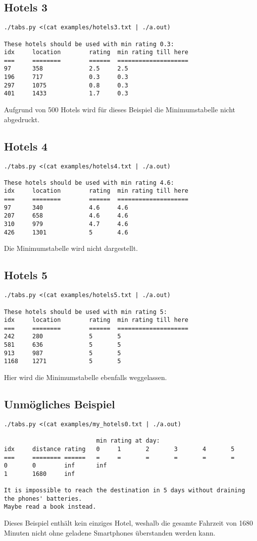 \documentclass[a4paper,10pt,ngerman]{scrartcl}
\begin{document}
\subsection*{Hotels 3}
\begin{lstlisting}
./tabs.py <(cat examples/hotels3.txt | ./a.out)

These hotels should be used with min rating 0.3:
idx     location        rating  min rating till here
===     ========        ======  ====================
97      358             2.5     2.5
196     717             0.3     0.3
297     1075            0.8     0.3
401     1433            1.7     0.3
\end{lstlisting}
Aufgrund von 500 Hotels wird für dieses Beispiel die Minimumstabelle nicht abgedruckt.

\subsection*{Hotels 4}
\begin{lstlisting}
./tabs.py <(cat examples/hotels4.txt | ./a.out)

These hotels should be used with min rating 4.6:
idx     location        rating  min rating till here
===     ========        ======  ====================
97      340             4.6     4.6
207     658             4.6     4.6
310     979             4.7     4.6
426     1301            5       4.6
\end{lstlisting}
Die Minimumstabelle wird nicht dargestellt.

\subsection*{Hotels 5}
\begin{lstlisting}
./tabs.py <(cat examples/hotels5.txt | ./a.out)

These hotels should be used with min rating 5:
idx     location        rating  min rating till here
===     ========        ======  ====================
242     280             5       5
581     636             5       5
913     987             5       5
1168    1271            5       5
\end{lstlisting}
Hier wird die Minimumstabelle ebenfalls weggelassen.

\subsection*{Unmögliches Beispiel}
\begin{lstlisting}
./tabs.py <(cat examples/my_hotels0.txt | ./a.out)

                          min rating at day:
idx     distance rating   0     1       2       3       4       5
===     ======== ======   =     =       =       =       =       =
0       0        inf      inf
1       1680     inf

It is impossible to reach the destination in 5 days without draining the phones' batteries.
Maybe read a book instead.
\end{lstlisting}
Dieses Beispiel enthält kein einziges Hotel, weshalb die gesamte Fahrzeit von 1680 Minuten nicht ohne geladene Smartphones überstanden werden kann.
\end{document}
